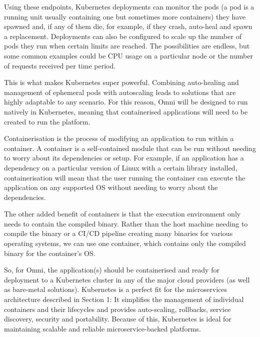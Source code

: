 Using these endpoints, Kubernetes deployments can monitor the pods (a pod is a running unit usually containing one but sometimes more containers) they have spawned and, if any of them die, for example, if they crash, auto-heal and spawn a replacement.
Deployments can also be configured to scale up the number of pods they run when certain limits are reached. The possibilities are endless, but some common examples could be CPU usage on a particular node or the number of requests received per time period.

This is what makes Kubernetes super powerful. Combining auto-healing and management of ephemeral pods with autoscaling leads to solutions that are highly adaptable to any scenario.
For this reason, Omni will be designed to run natively in Kubernetes, meaning that containerised applications will need to be created to run the platform.

Containerisation is the process of modifying an application to run within a container. A container is a self-contained module that can be run without needing to worry about its dependencies or setup. For example, if an application has a dependency on a particular version of Linux with a certain library installed, containerisation will mean that the user running the container can execute the application on any supported OS without needing to worry about the dependencies.

The other added benefit of containers is that the execution environment only needs to contain the compiled binary. Rather than the host machine needing to compile the binary or a CI/CD pipeline creating many binaries for various operating systems, we can use one container, which contains only the compiled binary for the container's OS.

So, for Omni, the application(s) should be containerised and ready for deployment to a Kubernetes cluster in any of the major cloud providers (as well as bare-metal solutions).
Kubernetes is a perfect fit for the microservices architecture described in Section 1: It simplifies the management of individual containers and their lifecycles and provides auto-scaling, rollbacks, service discovery, security and portability. Because of this, Kubernetes is ideal for maintaining scalable and reliable microservice-backed platforms.

